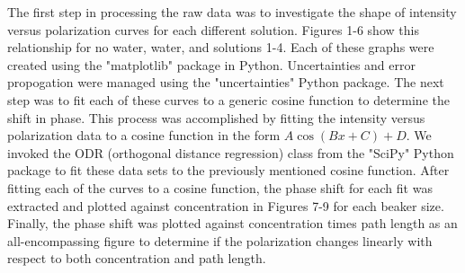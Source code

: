 
The first step in processing the raw data was to investigate the shape of intensity versus polarization curves for each different solution. Figures 1-6 show this relationship for no water, water, and solutions 1-4. Each of these graphs were created using the "matplotlib" package in Python. Uncertainties and error propogation were managed using the "uncertainties" Python package. 
The next step was to fit each of these curves to a generic cosine function to determine the shift in phase. This process was accomplished by fitting the intensity versus polarization data to a cosine function in the form $A\cos{\left(Bx+C\right)}+D$. We invoked the ODR (orthogonal distance regression) class from the "SciPy" Python package to fit these data sets to the previously mentioned cosine function.
After fitting each of the curves to a cosine function, the phase shift for each fit was extracted and plotted against concentration in Figures 7-9 for each beaker size.
Finally, the phase shift was plotted against concentration times path length as an all-encompassing figure to determine if the polarization changes linearly with respect to both concentration and path length.